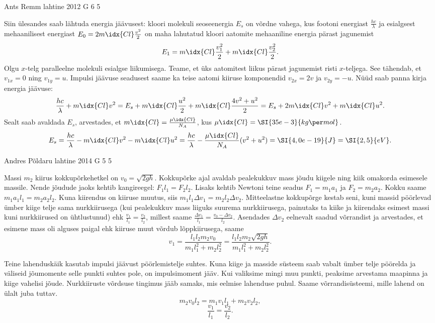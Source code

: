\documentclass[11pt]{article}
\begin{document}
{%
{Ants Remm} %
{lahtine} %
{2012} %
{G 6} %
{5} %
{

\ifSolution
Siin ülesandes saab lähtuda energia jäävusest: kloori molekuli seoseenergia $E_s$ on võrdne vahega, kus footoni energiast $\frac{hc}{\lambda}$ ja esialgsest mehaanilisest energiast $E_0 = 2m\idx{Cl} \frac{v^2}{2} $ on maha lahutatud kloori aatomite mehaaniline energia pärast jagunemist
\[
E_1 = m\idx{Cl} \frac{v_1^2}{2} + m\idx{Cl} \frac{v_2^2}{2}.
\]
Olgu $x$-telg paralleelne molekuli esialgse liikumisega. Teame, et üks aatomitest liikus pärast jagunemist risti $x$-teljega. See tähendab, et $v_{1x} = 0$ ning $v_{1y} = u$. Impulsi jäävuse seadusest saame ka teise aatomi kiiruse komponendid $v_{2x} = 2 v$ ja $v_{2y} = -u$. Nüüd saab panna kirja energia jäävuse:
$$
	\frac{hc}{\lambda} + m\idx{Cl} v^2 = E_s + m\idx{Cl} \frac{u^2}{2} + m\idx{Cl} \frac{4v^2 + u^2}{2} = E_s + 2 m\idx{Cl} v^2 + m\idx{Cl} u^2.
$$
Sealt saab avaldada $E_s$, arvestades, et $m\idx{Cl} = \frac{\mu\idx{Cl}}{N_A}$, kus $\mu\idx{Cl} = \SI{35e-3}{kg\per mol}$.
$$ E_s = \frac{hc}{\lambda} - m\idx{Cl} v^2 - m\idx{Cl} u^2 = \frac{hc}{\lambda} - \frac{\mu\idx{Cl}}{N_A} (v^2 + u^2) = \SI{4,0e-19}{J} = \SI{2,5}{eV}.
$$
\fi
}

{Andres Põldaru} %
{lahtine} %
{2014} %
{G 5} %
{5} %
{

\ifSolution
Massi $m_2$ kiirus kokkupõrkehetkel on $v_0=\sqrt{2gh}$. Kokkupõrke ajal avaldab pealekukkuv mass jõudu kiigele ning kiik omakorda esimesele massile. Nende jõudude jaoks kehtib kangireegel: $F_1l_1=F_2l_2$. Lisaks kehtib Newtoni teine seadus $F_1=m_1a_1$ ja $F_2=m_2a_2$. Kokku saame $m_1a_1l_1=m_2a_2l_2$. Kuna kiirendus on kiiruse muutus, siis $m_1l_1\Delta v_1=m_2l_2\Delta v_2$. Mitteelastne kokkupõrge kestab seni, kuni massid pöörlevad ümber kiige telje sama nurkkiirusega (kui pealekukkuv mass liiguks suurema nurkkiirusega, painutaks ta kiike ja kiirendaks esimest massi kuni nurkkiirused on ühtlustunud) ehk $\frac{v_1}{l_1}=\frac{v_2}{l_2}$, millest saame $\frac{\Delta v_1}{l_1}=\frac{v_0-\Delta v_2}{l_2}$. Asendades $\Delta v_2$ eelnevalt saadud võrrandist ja arvestades, et esimene mass oli alguses paigal ehk kiiruse muut võrdub lõppkiirusega, saame 
\[
v_1=\frac{l_1l_2m_2v_0}{m_1l_1^2+m_2l_2^2}=\frac{l_1l_2m_2\sqrt{2gh}}{m_1l_1^2+m_2l_2^2}.
\]

Teine lahenduskäik kasutab impulsi jäävust pöörlemistelje suhtes. Kuna kiige ja masside süsteem saab vabalt ümber telje pöörelda ja väliseid jõumomente selle punkti suhtes pole, on impulsimoment jääv. Kui valiksime mingi muu punkti, peaksime arvestama maapinna ja kiige vahelisi jõude. Nurkkiiruste võrdsuse tingimus jääb samaks, mis eelmise lahenduse puhul. Saame võrrandisüsteemi, mille lahend on ülalt juba tuttav.
\[
 m_2v_0l_2=m_1v_1l_1+m_2v_2l_2,
\]
\[
\frac{v_1}{l_1}=\frac{v_2}{l_2}.
\]
\fi
}

}
\end{document}
